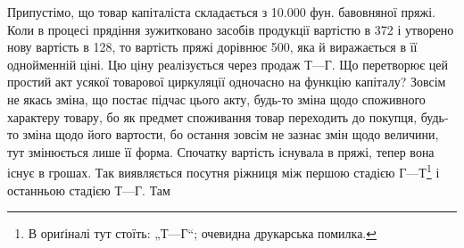 Припустімо, що товар капіталіста складається з \num{10.000} фун. бавовняної
пряжі. Коли в процесі прядіння зужитковано засобів продукції вартістю
в 372 і утворено нову вартість в 128, то вартість
пряжі дорівнює 500, яка й виражається в її однойменній ціні.
Цю ціну реалізується через продаж $Т — Г$. Що перетворює цей простий
акт усякої товарової циркуляції одночасно на функцію капіталу? Зовсім
не якась зміна, що постає підчас цього акту, будь-то зміна щодо споживного
характеру товару, бо як предмет споживання товар переходить до покупця,
будь-то зміна щодо його вартости, бо остання зовсім не зазнає змін
щодо величини, тут змінюється лише її форма. Спочатку вартість існувала
в пряжі, тепер вона існує в грошах. Так виявляється посутня
ріжниця між першою стадією $Г — Т$\footnote*{
В ориґіналі тут стоїть: „$Т — Г$“; очевидна друкарська помилка. 
} і останньою стадією $Т — Г$. Там
\parbreak{}  %
